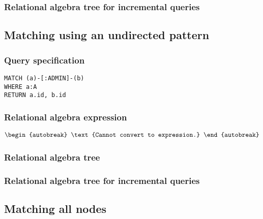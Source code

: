
\subsubsection*{Relational algebra tree for incremental queries}


\subsection{Matching using an undirected pattern}

\subsubsection*{Query specification}

\begin{lstlisting}
MATCH (a)-[:ADMIN]-(b)
WHERE a:A
RETURN a.id, b.id
\end{lstlisting}

\subsubsection*{Relational algebra expression}

\begin{align*}
\begin{autobreak}
\text{Cannot convert to expression.}
\end{autobreak}
\end{align*}

\subsubsection*{Relational algebra tree}


\subsubsection*{Relational algebra tree for incremental queries}


\subsection{Matching all nodes}

